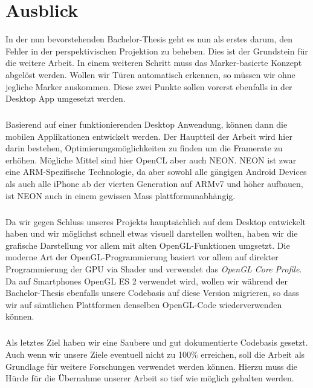 \chapter{Ausblick}

In der nun bevorstehenden Bachelor-Thesis geht es nun als erstes darum, den Fehler in der perspektivischen Projektion zu beheben. Dies ist der Grundstein für die weitere Arbeit. In einem weiteren Schritt muss das Marker-basierte Konzept abgelöst werden. Wollen wir Türen automatisch erkennen, so müssen wir ohne jegliche Marker auskommen. Diese zwei Punkte sollen vorerst ebenfalls in der Desktop App umgesetzt werden.
\paragraph{}
Basierend auf einer funktionierenden Desktop Anwendung, können dann die mobilen Applikationen entwickelt werden. Der Hauptteil der Arbeit wird hier darin bestehen, Optimierungsmöglichkeiten zu finden um die Framerate zu erhöhen. Mögliche Mittel sind hier OpenCL aber auch NEON. NEON ist zwar eine ARM-Spezifische Technologie, da aber sowohl alle gängigen Android Devices als auch alle iPhone ab der vierten Generation auf ARMv7 und höher aufbauen, ist NEON auch in einem gewissen Mass plattformunabhängig.
\paragraph{}
Da wir gegen Schluss unseres Projekts hauptsächlich auf dem Desktop entwickelt haben und wir möglichst schnell etwas visuell darstellen wollten, haben wir die grafische Darstellung vor allem mit alten OpenGL-Funktionen umgsetzt. Die moderne Art der OpenGL-Programmierung basiert vor allem auf direkter Programmierung der GPU via Shader und verwendet das \textit{OpenGL Core Profile}. Da auf Smartphones OpenGL ES 2 verwendet wird, wollen wir während der Bachelor-Thesis ebenfalls unsere Codebasis auf diese Version migrieren, so dass wir auf sämtlichen Plattformen denselben OpenGL-Code wiederverwenden können.
\paragraph{}
Als letztes Ziel haben wir eine Saubere und gut dokumentierte Codebasis gesetzt. Auch wenn wir unsere Ziele eventuell nicht zu 100\% erreichen, soll die Arbeit als Grundlage für weitere Forschungen verwendet werden können. Hierzu muss die Hürde für die Übernahme unserer Arbeit so tief wie möglich gehalten werden.
